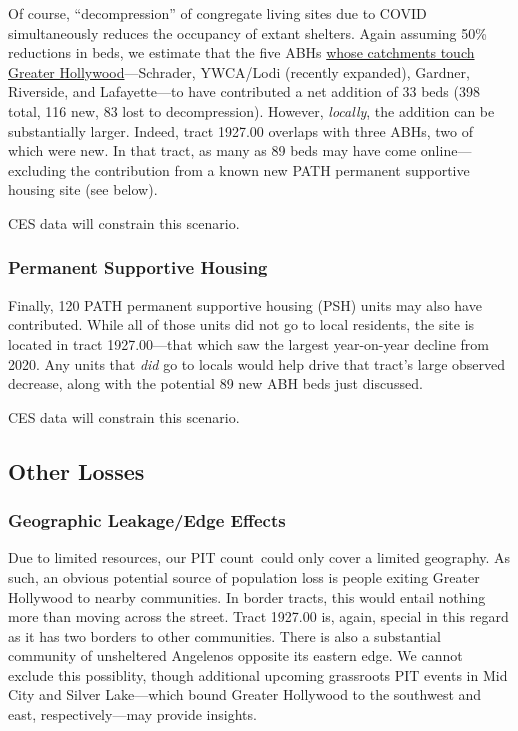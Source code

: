 \documentclass[11pt,twocolumn]{article}
\def\Count{count}
\def\resp{respectively}
\begin{document}
Of course, ``decompression'' of congregate living sites due to COVID simultaneously reduces the occupancy of extant 
shelters. Again assuming 50\% reductions in beds, we estimate that the five ABHs \href{https://arcg.is/0fy81}
{whose catchments touch Greater Hollywood}---Schrader, YWCA/Lodi (recently expanded), Gardner, Riverside, and 
Lafayette---to have contributed a net addition of 33 beds (398 total, 116 new, 83 lost to decompression). However,
{\it locally}, the addition can be substantially larger. Indeed, tract 1927.00 overlaps with three ABHs, two of which 
were new. In that tract, as many as 89 beds may have come online---excluding the contribution from a known new
PATH permanent supportive housing site (see below).

CES data will constrain this scenario.

\subsubsection{Permanent Supportive Housing}

Finally, 120 PATH permanent supportive housing (PSH) units may also have contributed. While all of those units did not 
go to local residents, the site is located in tract 1927.00---that which saw the largest year-on-year decline from 2020. Any 
units that {\it did} go to locals would help drive that tract's large observed decrease, along with the potential 89 new
ABH beds just discussed. 

CES data will constrain this scenario.

\subsection{Other Losses}

\subsubsection{Geographic Leakage/Edge Effects}

Due to limited resources, our PIT \Count\ could only cover a limited geography. As such, an obvious potential source
of population loss is people exiting Greater Hollywood to nearby communities. In border tracts, this would entail nothing
more than moving across the street. Tract 1927.00 is, again, special in this regard as it has two borders to other communities.
There is also a substantial community of unsheltered Angelenos opposite its eastern edge. We cannot exclude this possiblity,
though additional upcoming grassroots PIT events in Mid City and Silver Lake---which bound Greater Hollywood to the
southwest and east, \resp---may provide insights.
\end{document}
